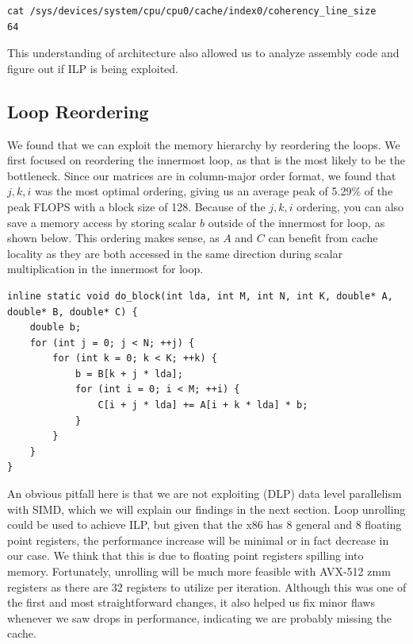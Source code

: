 \documentclass{article}
\begin{document}
\begin{lstlisting}
cat /sys/devices/system/cpu/cpu0/cache/index0/coherency_line_size 
64
\end{lstlisting}

This understanding of architecture also allowed us to analyze assembly code and figure out if ILP is being exploited.

\subsection{Loop Reordering}
We found that we can exploit the memory hierarchy by reordering the loops. We first focused on reordering the innermost loop, as that is the most likely to be the bottleneck. Since our matrices are in column-major order format, we found that $j, k, i$ was the most optimal ordering, giving us an average peak of 5.29\% of the peak FLOPS with a block size of 128. Because of the $j, k , i$ ordering, you can also save a memory access by storing scalar $b$ outside of the innermost for loop, as shown below. This ordering makes sense, as $A$ and $C$ can benefit from cache locality as they are both accessed in the same direction during scalar multiplication in the innermost for loop.
\begin{verbatim}
inline static void do_block(int lda, int M, int N, int K, double* A, double* B, double* C) {
    double b;
    for (int j = 0; j < N; ++j) {
        for (int k = 0; k < K; ++k) {
            b = B[k + j * lda];
            for (int i = 0; i < M; ++i) {
                C[i + j * lda] += A[i + k * lda] * b;
            }
        }
    }
}
\end{verbatim}

An obvious pitfall here is that we are not exploiting (DLP) data level parallelism with SIMD, which we will explain our findings in the next section. Loop unrolling could be used to achieve ILP, but given that the x86 has 8 general and 8 floating point registers, the performance increase will be minimal or in fact decrease in our case. We think that this is due to floating point registers spilling into memory. Fortunately, unrolling will be much more feasible with AVX-512 zmm registers as there are 32 registers to utilize per iteration. Although this was one of the first and most straightforward changes, it also helped us fix minor flaws whenever we saw drops in performance, indicating we are probably missing the cache.
\end{document}
